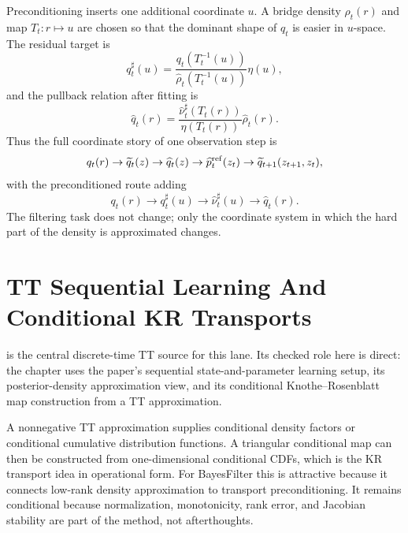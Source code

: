 Preconditioning inserts one additional coordinate \(u\).  A bridge density
\(\rho_t(r)\) and map \(T_t:r\mapsto u\) are chosen so that the dominant shape
of \(q_t\) is easier in \(u\)-space.  The residual target is
\begin{equation}
  q_t^\sharp(u)=
  \frac{q_t(T_t^{-1}(u))}{\widehat\rho_t(T_t^{-1}(u))}\eta(u),
  \label{eq:bf-hd-ttkr-walk-residual}
\end{equation}
and the pullback relation after fitting is
\begin{equation}
  \widehat q_t(r)=
  \frac{\widehat\nu_t^\sharp(T_t(r))}{\eta(T_t(r))}\widehat\rho_t(r).
  \label{eq:bf-hd-ttkr-walk-pullback}
\end{equation}
Thus the full coordinate story of one observation step is
\begin{equation}
  q_t(r)
  \to
  \widetilde q_t(z)
  \to
  \widehat q_t(z)
  \to
  \widehat p_t^{\rm ref}(z_t)
  \to
  \widetilde q_{t+1}(z_{t+1},z_t),
  \label{eq:bf-hd-ttkr-walk-full-chain}
\end{equation}
with the preconditioned route adding
\begin{equation}
  q_t(r)\to q_t^\sharp(u)\to\widehat\nu_t^\sharp(u)\to\widehat q_t(r).
  \label{eq:bf-hd-ttkr-walk-preconditioned-chain}
\end{equation}
The filtering task does not change; only the coordinate system in which the hard
part of the density is approximated changes.

\section{TT Sequential Learning And Conditional KR Transports}
\label{sec:bf-hd-zhao-cui}

\citet{zhao2024ttsequential} is the central discrete-time TT source for this
lane.  Its checked role here is direct: the chapter uses the paper’s sequential
state-and-parameter learning setup, its posterior-density approximation view,
and its conditional Knothe--Rosenblatt map construction from a TT approximation.

A nonnegative TT approximation supplies conditional density factors or
conditional cumulative distribution functions.  A triangular conditional map can
then be constructed from one-dimensional conditional CDFs, which is the KR
transport idea in operational form.  For BayesFilter this is attractive because
it connects low-rank density approximation to transport preconditioning.  It
remains conditional because normalization, monotonicity, rank error, and
Jacobian stability are part of the method, not afterthoughts.

